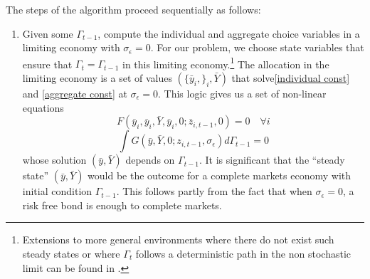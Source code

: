 \documentclass[thmsb,11pt]{article}
\begin{document}
\color{black}


The steps of the algorithm proceed sequentially as follows:

\begin{enumerate}
\item Given some $\Gamma_{t-1}$, compute the individual and aggregate choice variables in a limiting economy with $\sigma_{\epsilon}=0$. For our problem, we choose state variables that ensure that  $\Gamma_{t}=\Gamma_{t-1}$ in this limiting economy.\footnote{Extensions to more general environments where there do not exist such steady states or where $\Gamma_t$ follows a deterministic path in the non stochastic limit can be found in \cite{Evans2014}.} The allocation in the limiting economy is a set of values $\left(\{\bar{y}_i,\}_i,\bar{Y}\right)$ that solve\eqref{individual const} and \eqref{aggregate const} at $\sigma_\epsilon=0$. This logic gives us a set of non-linear equations
\begin{equation}
	\label{individual const ss}
			F(\bar y_{i}, \bar{y}_i, \bar{Y}, \bar{y}_i ,0; \bar{z}_{i,t-1},0) = 0  \quad \forall i
	\end{equation}	
	\begin{equation}
	\label{aggregate const ss}
		\int G(\bar{y},\bar{Y},0;z_{i,t-1},\sigma_\epsilon) d\Gamma_{t-1}= 0	
	\end{equation}
whose solution $(\bar{y},\bar{Y})$  depends on $\Gamma_{t-1}$.  It is significant that the ``steady state'' $(\bar{y},\bar{Y})$ would be the outcome
for a complete markets economy  with initial condition $\Gamma_{t-1}$. This follows partly from the fact that when $\sigma_\epsilon=0$,
a risk free bond is enough to complete markets.


\end{enumerate}
\end{document}
